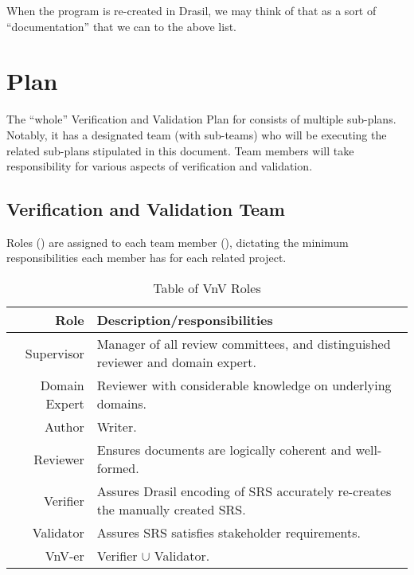\documentclass[12pt, titlepage]{article}
\begin{document}
\noindent{}When the \progname{} program is re-created in Drasil, we may think of
that as a sort of ``documentation'' that we can to the above list.

\newpage{}

\section{Plan}

The ``whole'' Verification and Validation Plan for \progname{} consists of
multiple sub-plans. Notably, it has a designated team (with sub-teams) who will
be executing the related sub-plans stipulated in this document. Team members
will take responsibility for various aspects of verification and validation.

\subsection{Verification and Validation Team}

Roles () are assigned to each team member
(), dictating the minimum responsibilities each member
has for each related project.

\begin{longtable}{|r|p{8cm}|}
    \caption{Table of VnV Roles}
    \label{table:vnv_roles}

    \\ \hline
    \rowcolor{Maroon}
    \textbf{Role}        & \textbf{Description/responsibilities}                                           \\ \hline
    \rowcolor{White}
    Supervisor           & Manager of all review committees, and distinguished reviewer and domain expert. \\ \hline
    Domain Expert        & Reviewer with considerable knowledge on underlying domains.                     \\ \hline
    Author               & Writer.                                                                         \\ \hline
    Reviewer             & Ensures documents are logically coherent and well-formed.                       \\ \hline
    Verifier             & Assures Drasil encoding of SRS accurately re-creates the manually created SRS.  \\ \hline
    Validator            & Assures SRS satisfies stakeholder requirements.                                 \\ \hline
    VnV-er               & Verifier \(\cup\) Validator.                                                    \\ \hline
\end{longtable}
\end{document}
